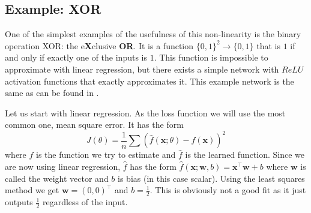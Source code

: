 \subsection{Example: XOR}

One of the simplest examples of the usefulness of this non-linearity is the binary operation XOR: the e\textbf{X}clusive \textbf{OR}. It is a function $\{0,1\}^2\rightarrow \{0,1\}$ that is $1$ if and only if exactly one of the inputs is $1$. This function is impossible to approximate with linear regression, but there exists a simple network with $ReLU$ activation functions that exactly approximates it. This example network is the same as can be found in \cite{neural}.

Let us start with linear regression. As the loss function we will use the most common one, mean square error. It has the form
$$J(\theta)=\frac{1}{n}\sum(\widehat{f}(\textbf{x};\theta)-f(\textbf{x}))^2$$
where $f$ is the function we try to estimate and $\widehat{f}$ is the learned function. Since we are now using linear regression, $\widehat{f}$ has the form $\widehat{f}(\textbf{x};\textbf{w},b)=\textbf{x}^\top \textbf{w}+b$ where $\textbf{w}$ is called the weight vector and $b$ is bias (in this case scalar). Using the least squares method we get $\textbf{w}=(0,0)^\top$ and $b=\frac{1}{2}$. This is obviously not a good fit as it just outputs $\frac{1}{2}$ regardless of the input.

